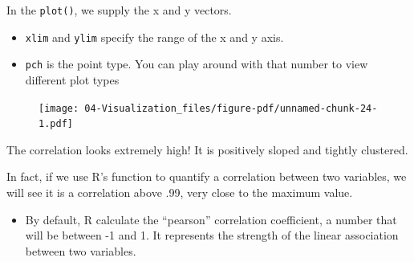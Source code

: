 \documentclass[
  letterpaper,
  DIV=11,
  numbers=noendperiod]{scrreprt}
\newenvironment{Shaded}{\begin{snugshade}}{\end{snugshade}}
\newcommand{\AttributeTok}[1]{\textcolor[rgb]{0.40,0.45,0.13}{#1}}
\newcommand{\DecValTok}[1]{\textcolor[rgb]{0.68,0.00,0.00}{#1}}
\newcommand{\DocumentationTok}[1]{\textcolor[rgb]{0.37,0.37,0.37}{\textit{#1}}}
\newcommand{\FunctionTok}[1]{\textcolor[rgb]{0.28,0.35,0.67}{#1}}
\newcommand{\NormalTok}[1]{\textcolor[rgb]{0.00,0.23,0.31}{#1}}
\newcommand{\SpecialCharTok}[1]{\textcolor[rgb]{0.37,0.37,0.37}{#1}}
\newcommand{\StringTok}[1]{\textcolor[rgb]{0.13,0.47,0.30}{#1}}
\providecommand{\tightlist}{%
  \setlength{\itemsep}{0pt}\setlength{\parskip}{0pt}}\usepackage{longtable,booktabs,array}
\begin{document}
In the \texttt{plot()}, we supply the x and y vectors.

\begin{itemize}
\tightlist
\item
  \texttt{xlim} and \texttt{ylim} specify the range of the x and y axis.
\item
  \texttt{pch} is the point type. You can play around with that number
  to view different plot types
\end{itemize}

\begin{Shaded}
\end{Shaded}

\begin{figure}[H]

{\centering \texttt{[image: 04-Visualization\_files/figure-pdf/unnamed-chunk-24-1.pdf]}

}

\end{figure}

The correlation looks extremely high! It is positively sloped and
tightly clustered.

In fact, if we use R's function to quantify a correlation between two
variables, we will see it is a correlation above .99, very close to the
maximum value.

\begin{itemize}
\tightlist
\item
  By default, R calculate the ``pearson'' correlation coefficient, a
  number that will be between -1 and 1. It represents the strength of
  the linear association between two variables.
\end{itemize}

\begin{Shaded}
\end{Shaded}
\end{document}
